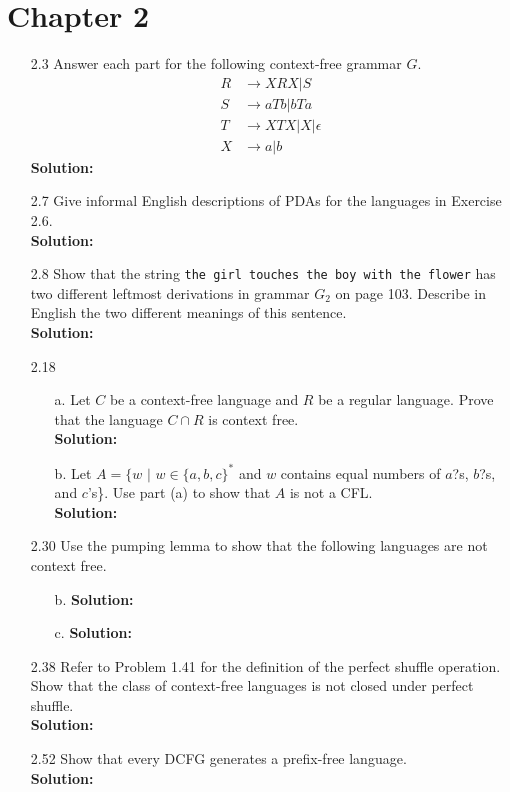 \section{Chapter 2}

\begin{enumerate}
\item[2.3]Answer each part for the following context-free grammar $G$.
\begin{align*}
R &\rightarrow XRX | S \\
S &\rightarrow aTb | bTa \\
T &\rightarrow XTX | X | \epsilon \\
X &\rightarrow a | b
\end{align*}
\textbf{Solution:} \alreadyanswered

\item[2.7]Give informal English descriptions of PDAs for the languages in Exercise 2.6.
\\
\textbf{Solution:} \alreadyanswered

\item[2.8]Show that the string \verb|the girl touches the boy with the flower| has two different leftmost derivations in grammar $G_2$ on page 103. Describe in English the two different meanings of this sentence.
\\
\textbf{Solution:} \alreadyanswered

\item[2.18]
\begin{enumerate}
\item[a.]Let $C$ be a context-free language and $R$ be a regular language. Prove that the language $C \cap R$ is context free.
\\
\textbf{Solution:} \alreadyanswered

\item[b.]Let $A = \{w$ $|$ $w \in \{a, b, c\}^*$ and $w$ contains equal numbers of $a$?s, $b$?s, and $c$'s\}. Use part (a) to show that $A$ is not a CFL.
\\
\textbf{Solution:} \alreadyanswered
\end{enumerate}

\item[2.30]Use the pumping lemma to show that the following languages are not context free.
\begin{enumerate}
\item[b.]\textbf{Solution:} \alreadyanswered
\item[c.]\textbf{Solution:} \alreadyanswered
\end{enumerate}

\item[2.38]Refer to Problem 1.41 for the definition of the perfect shuffle operation. Show that the class of context-free languages is not closed under perfect shuffle.
\\
\textbf{Solution:} \alreadyanswered

\item[2.52]Show that every DCFG generates a prefix-free language.
\\
\textbf{Solution:} \alreadyanswered

\end{enumerate}